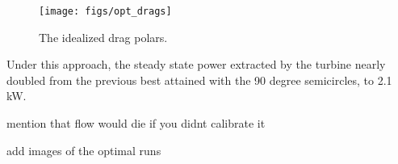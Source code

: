 \begin{figure}[!htb]
  \begin{center}
    \texttt{[image: figs/opt\_drags]}
    \caption{The idealized drag polars.} 
    \label{drags}
  \end{center}
\end{figure}

Under this approach, the steady state power extracted by the
turbine nearly doubled from the previous best attained with the 90
degree semicircles, to 2.1 kW.

mention that flow would die if you didnt calibrate it

add images of the optimal runs
